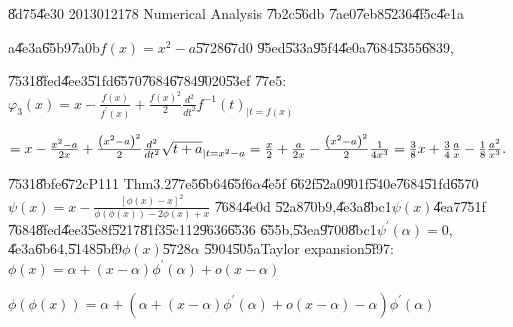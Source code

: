 \documentclass{article}
\begin{document}
\bigskip \U{8d75}\U{4e30} 2013012178 Numerical Analysis \U{7b2c}\U{56db}%
\U{7ae0}\U{7eb8}\U{5236}\U{4f5c}\U{4e1a}


\bigskip a\U{4e3a}\U{65b9}\U{7a0b}$f\left( x\right) =x^{2}-a$\U{5728}\U{67d0}%
\U{95ed}\U{533a}\U{95f4}\U{4e0a}\U{7684}\U{5355}\U{6839},

\U{7531}\U{8fed}\U{4ee3}\U{51fd}\U{6570}\U{7684}\U{6784}\U{9020}\U{53ef}%
\U{77e5}:$\varphi _{3}\left( x\right) =x-\frac{f\left( x\right) }{f^{\prime
}\left( x\right) }+\frac{f\left( x\right) ^{2}}{2}\frac{d^{2}}{dt^{2}}%
f^{-1}\left( t\right) _{|t=f\left( x\right) }$

$=x-\frac{x^{2}-a}{2x}+\frac{\left( x^{2}-a\right) ^{2}}{2}\frac{d^{2}}{%
dt^{2}}\sqrt{t+a}_{|t=x^{2}-a}=\frac{x}{2}+\frac{a}{2x}-\frac{\left(
x^{2}-a\right) ^{2}}{2}\frac{1}{4x^{3}}=\allowbreak \allowbreak \frac{3}{8}x+%
\frac{3}{4}\frac{a}{x}-\frac{1}{8}\frac{a^{2}}{x^{3}}.$


\U{7531}\U{8bfe}\U{672c}P111 Thm3.2\U{77e5}\U{6b64}\U{65f6}$\alpha $\U{4e5f}%
\U{662f}\U{52a0}\U{901f}\U{540e}\U{7684}\U{51fd}\U{6570}$\psi \left(
x\right) =x-\frac{\left[ \phi \left( x\right) -x\right] ^{2}}{\phi \left(
\phi \left( x\right) \right) -2\phi \left( x\right) +x}$ \U{7684}\U{4e0d}%
\U{52a8}\U{70b9},\U{4e3a}\U{8bc1}$\psi \left( x\right) $\U{4ea7}\U{751f}%
\U{7684}\U{8fed}\U{4ee3}\U{5e8f}\U{5217}\U{81f3}\U{5c11}2\U{9636}\U{6536}%
\U{655b},\U{53ea}\U{9700}\U{8bc1}$\psi ^{\prime }\left( \alpha \right) =0,$%
\U{4e3a}\U{6b64},\U{5148}\U{5bf9}$\phi \left( x\right) $\U{5728}$\alpha $%
\U{5904}\U{505a}Taylor expansion\U{5f97}: $\phi (x)=\alpha +\left( x-\alpha
\right) \phi ^{\prime }\left( \alpha \right) +o(x-\alpha )$

$\phi \left( \phi \left( x\right) \right) =\alpha +\left( \alpha +\left(
x-\alpha \right) \phi ^{\prime }\left( \alpha \right) +o(x-\alpha )-\alpha
\right) \phi ^{\prime }\left( \alpha \right) $
\end{document}
